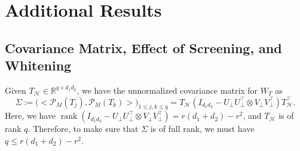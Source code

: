 \documentclass[12pt]{article}
\newcommand{\R}{\mathbb{R}}
\newcommand{\cH}{\mathcal{H}}
\def\calP{{\mathcal P}}
\theoremstyle{plain}
\begin{document}
\section{Additional Results}\label{sec:add-res}






\subsection{Covariance Matrix, Effect of Screening, and Whitening}
Given $T_{\cH}\in \R^{q\times d_1 d_2} $, we have the unnormalized covariance matrix for $W_T$ as
\begin{equation*}
    \Sigma:= \big(\big<\calP_M(T_j),  \calP_M(T_k)\big>\big)_{1\leq j,k\leq q}=T_{\cH}(I_{d_1 d_2} - U_\perp U_\perp^\top \otimes V_\perp V_\perp^\top  ) T_{\cH}^\top.
\end{equation*}
Here, we have $\operatorname{rank}(I_{d_1 d_2} - U_\perp U_\perp^\top \otimes V_\perp V_\perp^\top  )=r(d_1+d_2)-r^2$, and $T_{\cH}$ is of rank $q$. Therefore, to make sure that $ \Sigma$ is of full rank, we must have $q\le r(d_1+d_2)-r^2$.
\end{document}
